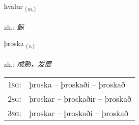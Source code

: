 \documentclass[frontgrid, backgrid]{flacards}\usepackage[]{graphicx}\usepackage[]{xcolor}
\begin{document}
\renewcommand{\flhead}{\vskip5pt \fboxsep=0pt {\small\bfseries\footnotesize Nafnorð | 名词}}
\renewcommand{\fcfoot}{\vskip5pt \fboxsep=0pt \hspace{2pt}{\small\bfseries\footnotesize 3K}}

\renewcommand{\blhead}{\vskip5pt {\small\bfseries\footnotesize Nafnorð | 名词 }}
\renewcommand{\bcfoot}{\vskip5pt \hspace{2pt}{\small\bfseries\footnotesize 3K}}


{hvalur \small{\textsubscript{(\textit{m.})}} \\[1ex] %
\textphonetic{[kʰvaːlʏr]} \\
zh.: \emph{鲸} \\  [2ex]
\renewcommand*{\arraystretch}{0.8}
}

\renewcommand{\flhead}{\vskip5pt \fboxsep=0pt {\small\bfseries\footnotesize Sagnorð | 动词}}
\renewcommand{\fcfoot}{\vskip5pt \fboxsep=0pt \hspace{2pt}{\small\bfseries\footnotesize 3K}}

\renewcommand{\blhead}{\vskip5pt {\small\bfseries\footnotesize Sagnorð | 动词 }}
\renewcommand{\bcfoot}{\vskip5pt \hspace{2pt}{\small\bfseries\footnotesize 3K}}


{þroska \small{\textsubscript{(\textit{v.})}} \\[1ex] %
\textphonetic{[θrɔska]} \\
zh.: \emph{成熟，发展} \\  [2ex]
\renewcommand*{\arraystretch}{0.8}
\begin{tabular}{p{1cm}l}
\textsc{1sg}: & þroska -- þroskaði -- þroskað \\ 
\textsc{2sg}: & þroskar -- þroskaðir -- þroskað \\ 
\textsc{3sg}: & þroskar -- þroskaði -- þroskað \\ 
\end{tabular}
}
\end{document}
